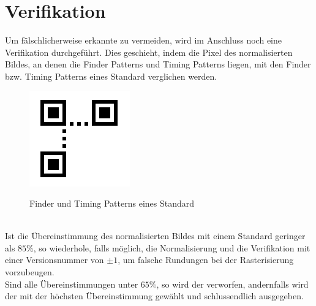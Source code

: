 \section{Verifikation}
Um fälschlicherweise erkannte \QRCodes zu vermeiden, wird im Anschluss noch eine Verifikation durchgeführt. Dies geschieht, indem die Pixel des normalisierten Bildes, an denen die Finder Patterns und Timing Patterns liegen, mit den Finder bzw. Timing Patterns eines Standard \QRCodes verglichen werden.
\begin{figure}[h]
\centering
\includegraphics[scale=0.5]{images/verifikation.png}
\label{fig:version-qrcode}\caption{Finder und Timing Patterns eines Standard \QRCode}
\end{figure}
\\
Ist die Übereinstimmung des normalisierten Bildes mit einem Standard \QRCode geringer als $85\%$, so wiederhole, falls möglich, die Normalisierung und die Verifikation mit einer Versionsnummer von $\pm 1$, um falsche Rundungen bei der Rasterisierung vorzubeugen.
\\
Sind alle Übereinstimmungen unter $65\%$, so wird der \QRCode verworfen, andernfalls wird der \QRCode mit der höchsten Übereinstimmung gewählt und schlussendlich ausgegeben.
